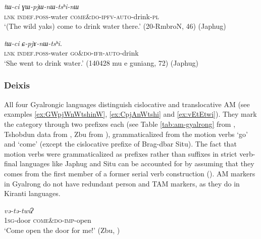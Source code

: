 \documentclass[oneside,a4paper,11pt]{article}
\newcommand{\ipa}[1]{{\phon\textit{#1}}}
\newcommand{\sens}[1]{‘#1’}
\newcommand{\rouge}[1]{{\color{red}#1}}
\begin{document}
\begin{exe}
\ex \label{ex:GWpjWnWtshinW}
\gll \ipa{tɕe}	\ipa{tɯ-ci}	\ipa{\rouge{ɣɯ}-pjɯ-nɯ-tsʰi-nɯ} \\
\textsc{lnk} \textsc{indef}.\textsc{poss}-water \rouge{\textsc{come\&do}}-\textsc{ipfv}-\textsc{auto}-drink-\textsc{pl} \\
\glt \sens{(The wild yaks) come to drink water there.} (20-RmbroN, 46) (Japhug)
\end{exe}

\begin{exe}
\ex \label{ex:CpjAnWtshi}
\gll \ipa{tɕe}	\ipa{tɯ-ci}	\ipa{\rouge{ɕ}-pjɤ-nɯ-tsʰi}. \\
\textsc{lnk} \textsc{indef}.\textsc{poss}-water \rouge{\textsc{go\&do}}-\textsc{ifr}-\textsc{auto}-drink  \\
\glt \sens{She went to drink water.} (140428 mu e guniang, 72) (Japhug)
\end{exe}

\subsubsection{Deixis}

All four Gyalrongic languages  distinguish cislocative and translocative AM (see examples \ref{ex:GWpjWnWtshinW}, \ref{ex:CpjAnWtshi} and \ref{ex:vEtEtwi}).  They mark the category through two prefixes each (see Table \ref{tab:am-gyalrong} from \citealt[200]{zhang16bragdbar}, Tshobdun data from \citealt{sun12complementation}, Zbu from \citealt{gong18these}), grammaticalized from the motion verbs `go' and `come' (except the cislocative prefixe of Brag-dbar Situ). The fact that motion verbs were grammaticalized as prefixes rather than suffixes in strict verb-final languages like Japhug and Situ can be accounted for by assuming that they comes from the first member of a former serial verb construction (\citealt{jacques13harmonization}). AM markers in Gyalrong do not have redundant person and TAM markers, as they do in Kiranti languages. 

\begin{exe}
\ex \label{ex:vEtEtwi}
\gll  \ipa{ɐ-kómʔ}	\ipa{\rouge{və}-tə-twíʔ} \\
\textsc{1sg}-door  \rouge{\textsc{come\&do}}-\textsc{imp}-open \\
\glt  \sens{Come open the door for me!} (Zbu, \citealt{gong18these})
\end{exe}
\end{document}
